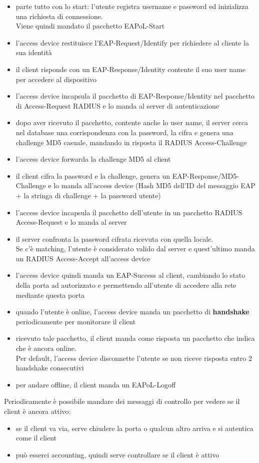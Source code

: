 \documentclass[12pt, oneside]{extbook} %
\begin{document}
    \begin{itemize}
        \item parte tutto con lo start: l'utente registra username e password ed inizializza una richiesta di connessione.
        \\Viene quindi mandato il pacchetto EAPoL-Start
        \item l'access device restituisce l'EAP-Request/Identify per richiedere al cliente la sua identità
        \item il client risponde con un EAP-Response/Identity contente il suo user name per accedere al dispositivo
        \item l'access device incapsula il pacchetto di EAP-Response/Identity nel pacchetto di Access-Request RADIUS e lo manda al server di autenticazione
        \item dopo aver ricevuto il pacchetto, contente anche lo user name, il server cerca nel database una corrispondenza con la password, la cifra e genera una challenge MD5 casuale, mandando in risposta il RADIUS Access-Challenge 
        \item l'access device forwarda la challenge MD5 al client
        \item il client cifra la password e la challenge, genera un EAP-Response/MD5-Challenge e lo manda all'access device (Hash MD5 dell'ID del messaggio EAP + la stringa di challenge + la password utente)
        \item l'access device incapsula il pacchetto dell'utente in un pacchetto RADIUS Access-Request e lo manda al server
        \item il server confronta la password cifrata ricevuta con quella locale.
        \\Se c'è matching, l'utente è considerato valido dal server e quest'ultimo manda un RADIUS Access-Accept all'access device
        \item l'access device quindi manda un EAP-Success al client, cambiando lo stato della porta ad autorizzato e permettendo all'utente di accedere alla rete mediante questa porta
        \item quando l'utente è online, l'access device manda un pacchetto di \textbf{handshake} periodicamente per monitorare il client
        \item ricevuto tale pacchetto, il client manda come risposta un pacchetto che indica che è ancora online.
        \\Per default, l'access device disconnette l'utente se non riceve risposta entro 2 handshake consecutivi
        \item per andare offline, il client manda un EAPoL-Logoff 
    \end{itemize}
Periodicamente è possibile mandare dei messaggi di controllo per vedere se il client è ancora attivo:
    \begin{itemize}
        \item se il client va via, serve chiudere la porta o qualcun altro arriva e si autentica come il client
        \item può esserci accounting, quindi serve controllare se il client è attivo
    \end{itemize}
\end{document}
